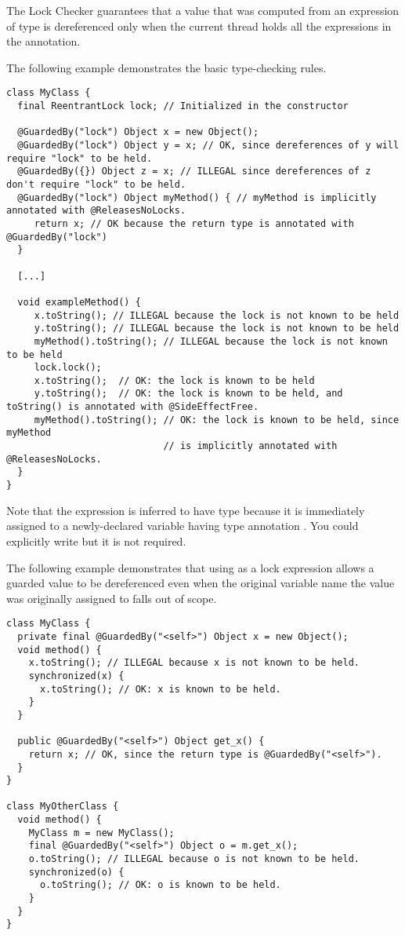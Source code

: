 The Lock Checker guarantees that a value that was computed from an expression of  type is
dereferenced only when the current thread holds all the expressions in the
 annotation.


The following example demonstrates the basic
type-checking rules.

\begin{Verbatim}
class MyClass {
  final ReentrantLock lock; // Initialized in the constructor

  @GuardedBy("lock") Object x = new Object();
  @GuardedBy("lock") Object y = x; // OK, since dereferences of y will require "lock" to be held.
  @GuardedBy({}) Object z = x; // ILLEGAL since dereferences of z don't require "lock" to be held.
  @GuardedBy("lock") Object myMethod() { // myMethod is implicitly annotated with @ReleasesNoLocks.
     return x; // OK because the return type is annotated with @GuardedBy("lock")
  }

  [...]

  void exampleMethod() {
     x.toString(); // ILLEGAL because the lock is not known to be held
     y.toString(); // ILLEGAL because the lock is not known to be held
     myMethod().toString(); // ILLEGAL because the lock is not known to be held
     lock.lock();
     x.toString();  // OK: the lock is known to be held
     y.toString();  // OK: the lock is known to be held, and toString() is annotated with @SideEffectFree.
     myMethod().toString(); // OK: the lock is known to be held, since myMethod
                            // is implicitly annotated with @ReleasesNoLocks.
  }
}
\end{Verbatim}

Note that the expression  is inferred to have type 
because it is immediately assigned to a newly-declared
variable having type annotation .  You could
explicitly write  but it is not
required.

The following example demonstrates that using  as a lock expression
allows a guarded value to be dereferenced even when the original
variable name the value was originally assigned to falls out of scope.

\begin{Verbatim}
class MyClass {
  private final @GuardedBy("<self>") Object x = new Object();
  void method() {
    x.toString(); // ILLEGAL because x is not known to be held.
    synchronized(x) {
      x.toString(); // OK: x is known to be held.
    }
  }

  public @GuardedBy("<self>") Object get_x() {
    return x; // OK, since the return type is @GuardedBy("<self>").
  }
}

class MyOtherClass {
  void method() {
    MyClass m = new MyClass();
    final @GuardedBy("<self>") Object o = m.get_x();
    o.toString(); // ILLEGAL because o is not known to be held.
    synchronized(o) {
      o.toString(); // OK: o is known to be held.
    }
  }
}
\end{Verbatim}



